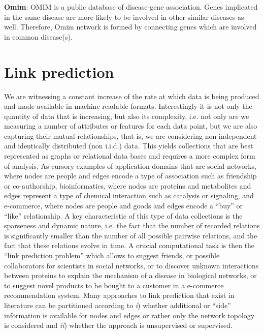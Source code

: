 \textbf{Omim}: OMIM is a public database of disease-gene association. Genes implicated in the same disease are more likely to be involved in other similar diseases as well. Therefore, Omim network is formed by connecting genes which are involved in common disease(s).

\section{Link prediction}
We are witnessing a constant increase of the rate at which data is being produced and made available in machine readable formats. Interestingly it is not only the quantity of data that is increasing, but also its complexity, i.e. not only are we measuring a number of attributes or features for each data point, but we are also capturing their mutual relationships, that is, we are considering non independent and identically distributed (non i.i.d.) data. This yields collections that are best represented as graphs or relational data bases and requires a more complex form of analysis. As cursory examples of application domains that are social networks, where nodes are people and edges encode a type of association such as friendship or co-authorship, bioinformatics, where nodes are proteins and metabolites and edges represent a type of chemical interaction such as catalysis or signaling, and e-commerce, where nodes are people and goods and edges encode a ``buy'' or ``like'' relationship.
A key characteristic of this type of data collections is the sparseness and dynamic nature, i.e. the fact that the number of recorded relations is significantly smaller than the number of all possible pairwise relations, and the fact that these relations evolve in time. A crucial computational task is then the ``link prediction problem'' which allows to suggest friends, or possible collaborators for scientists in social networks, or to discover unknown interactions between proteins to explain the mechanism of a disease in biological networks, or to suggest novel products to be bought to a customer in a e-commerce recommendation system. Many approaches to link prediction that exist in literature can be partitioned according to \textit{i}) whether additional or ``side'' information is available for nodes and edges or rather only the network topology is considered and \textit{ii}) whether the approach is unsupervised or supervised. 


